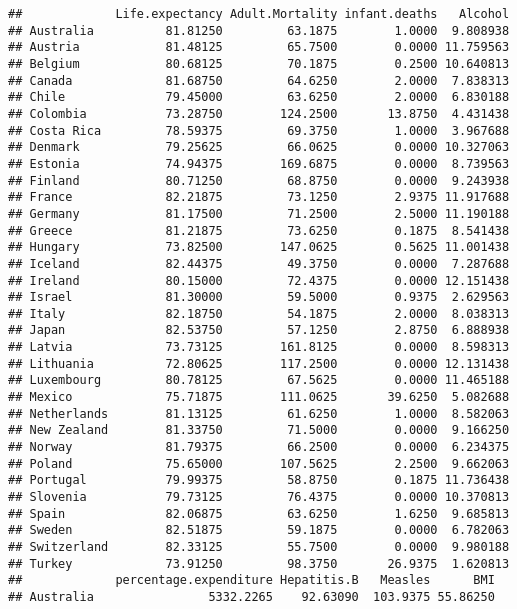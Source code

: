 \documentclass[
]{article}
\begin{document}
\begin{verbatim}
##             Life.expectancy Adult.Mortality infant.deaths   Alcohol
## Australia          81.81250         63.1875        1.0000  9.808938
## Austria            81.48125         65.7500        0.0000 11.759563
## Belgium            80.68125         70.1875        0.2500 10.640813
## Canada             81.68750         64.6250        2.0000  7.838313
## Chile              79.45000         63.6250        2.0000  6.830188
## Colombia           73.28750        124.2500       13.8750  4.431438
## Costa Rica         78.59375         69.3750        1.0000  3.967688
## Denmark            79.25625         66.0625        0.0000 10.327063
## Estonia            74.94375        169.6875        0.0000  8.739563
## Finland            80.71250         68.8750        0.0000  9.243938
## France             82.21875         73.1250        2.9375 11.917688
## Germany            81.17500         71.2500        2.5000 11.190188
## Greece             81.21875         73.6250        0.1875  8.541438
## Hungary            73.82500        147.0625        0.5625 11.001438
## Iceland            82.44375         49.3750        0.0000  7.287688
## Ireland            80.15000         72.4375        0.0000 12.151438
## Israel             81.30000         59.5000        0.9375  2.629563
## Italy              82.18750         54.1875        2.0000  8.038313
## Japan              82.53750         57.1250        2.8750  6.888938
## Latvia             73.73125        161.8125        0.0000  8.598313
## Lithuania          72.80625        117.2500        0.0000 12.131438
## Luxembourg         80.78125         67.5625        0.0000 11.465188
## Mexico             75.71875        111.0625       39.6250  5.082688
## Netherlands        81.13125         61.6250        1.0000  8.582063
## New Zealand        81.33750         71.5000        0.0000  9.166250
## Norway             81.79375         66.2500        0.0000  6.234375
## Poland             75.65000        107.5625        2.2500  9.662063
## Portugal           79.99375         58.8750        0.1875 11.736438
## Slovenia           79.73125         76.4375        0.0000 10.370813
## Spain              82.06875         63.6250        1.6250  9.685813
## Sweden             82.51875         59.1875        0.0000  6.782063
## Switzerland        82.33125         55.7500        0.0000  9.980188
## Turkey             73.91250         98.3750       26.9375  1.620813
##             percentage.expenditure Hepatitis.B   Measles      BMI
## Australia                5332.2265    92.63090  103.9375 55.86250

\end{verbatim}
\end{document}
